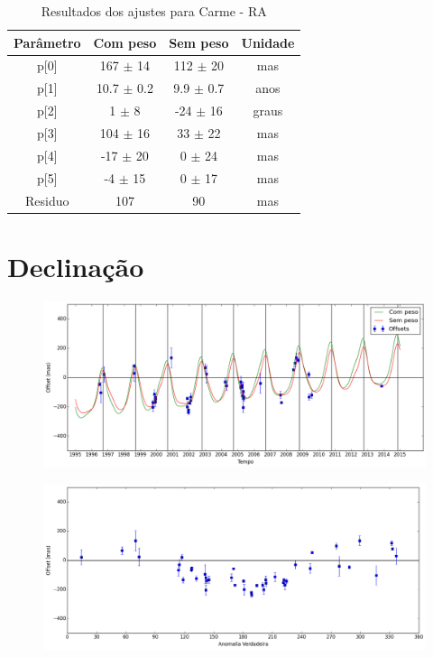 \documentclass[11pt,a4paper]{report}
\begin{document}
\begin{table}[h!]
\caption{\label{Tab: Carme-RA} Resultados dos ajustes para Carme - RA}
\begin{centering}
\begin{tabular}{cccc}
\hline
\hline
Parâmetro & Com peso & Sem peso & Unidade\tabularnewline
\hline
p[0] & 167 $\pm$ 14 & 112 $\pm$ 20 & mas\\
p[1] & 10.7 $\pm$ 0.2 & 9.9 $\pm$ 0.7 & anos\\
p[2] & 1 $\pm$ 8 & -24 $\pm$ 16 & graus\\
p[3] & 104 $\pm$ 16 & 33 $\pm$ 22 & mas\\
p[4] & -17 $\pm$ 20 & 0 $\pm$ 24 & mas\\
p[5] & -4 $\pm$ 15 & 0 $\pm$ 17 & mas\\
Residuo & 107 & 90 & mas\\
\hline 
\end{tabular} 
\par\end{centering}
\end{table}

\section*{Declinação}

\begin{figure}[h]
\includegraphics[scale=0.45]{Carme/DEC.png} 
\end{figure}

\begin{figure}[h]
\includegraphics[scale=0.45]{Carme/DEC_anom.png}  
\end{figure}
\end{document}
